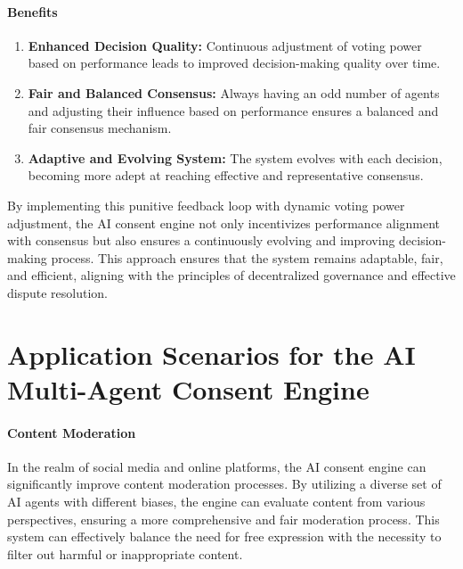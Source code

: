 \documentclass{article}
\begin{document}
\hypertarget{benefits}{%
\paragraph{Benefits}\label{benefits}}

\begin{enumerate}
\def\labelenumi{\arabic{enumi}.}
\item
  \textbf{Enhanced Decision Quality:} Continuous adjustment of voting
  power based on performance leads to improved decision-making quality
  over time.
\item
  \textbf{Fair and Balanced Consensus:} Always having an odd number of
  agents and adjusting their influence based on performance ensures a
  balanced and fair consensus mechanism.
\item
  \textbf{Adaptive and Evolving System:} The system evolves with each
  decision, becoming more adept at reaching effective and representative
  consensus.
\end{enumerate}

By implementing this punitive feedback loop with dynamic voting power
adjustment, the AI consent engine not only incentivizes performance
alignment with consensus but also ensures a continuously evolving and
improving decision-making process. This approach ensures that the system
remains adaptable, fair, and efficient, aligning with the principles of
decentralized governance and effective dispute resolution.

\hypertarget{application-scenarios-for-the-ai-multi-agent-consent-engine}{%
\section*{Application Scenarios for the AI Multi-Agent Consent
Engine}\label{application-scenarios-for-the-ai-multi-agent-consent-engine}}

\hypertarget{content-moderation}{%
\paragraph{Content Moderation}\label{content-moderation}}

In the realm of social media and online platforms, the AI consent engine
can significantly improve content moderation processes. By utilizing a
diverse set of AI agents with different biases, the engine can evaluate
content from various perspectives, ensuring a more comprehensive and
fair moderation process. This system can effectively balance the need
for free expression with the necessity to filter out harmful or
inappropriate content.
\end{document}
